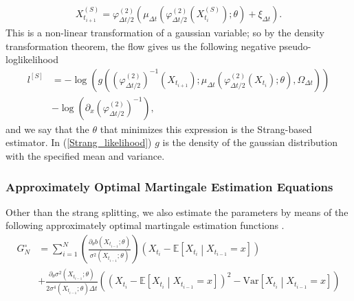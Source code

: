 \begin{align}
    X_{t_{i+1}}^{(S)} = \varphi_{\Delta t / 2}^{(2)}\left(\mu_{\Delta t}\left(\varphi_{\Delta t/2}^{(2)}\left(X_{t_{i}}^{(S)}\right); \theta\right) + \xi_{\Delta t}\right).
\end{align}
This is a non-linear transformation of a gaussian variable; so by the density transformation theorem, the flow gives us the following negative pseudo-loglikelihood 
\begin{align}
    l^{[S]} &= -\log\left(g\left(\left(\varphi_{\Delta t / 2}^{(2)}\right)^{-1}\left(X_{t_{i+1}}\right); \mu_{\Delta t}\left(\varphi_{\Delta t/2}^{(2)}\left(X_{t_{i}}\right); \theta \right), \Omega_{\Delta t} \right) \right) \nonumber \\
    &- \log\left(\partial_x \left(\varphi_{\Delta t / 2}^{(2)}\right)^{-1} \right), \label{Strang_likelihood}
\end{align}
and we say that the $\theta$ that minimizes this expression is the Strang-based estimator. In (\ref{Strang_likelihood}) $g$ is the density of the gaussian distribution with the specified mean and variance.
\subsubsection{Approximately Optimal Martingale Estimation Equations}
Other than the strang splitting, we also estimate the parameters by means of the following approximately optimal martingale estimation functions \cite[Example 1.11]{StatisticalMethodsForSDE}.
\begin{align}
    G_N^{\circ} &= \sum_{i = 1}^N 
    \left(
        \frac{\partial_\theta b\left(X_{t_{i-1}};\theta\right)}{\sigma^2\left(X_{t_{i-1}};\theta\right)}
    \right) \left(X_{t_{i}} - \mathbb{E}\left[X_{t_{i}} \middle| X_{t_{i-1}} = x\right]\right) \nonumber \\
    &+ \frac{\partial_\theta\sigma^2\left(X_{t_{i-1}}; \theta\right)}{2\sigma^4\left(X_{t_{i - 1}}; \theta\right)\Delta t}\left(\left(X_{t_{i}} - \mathbb{E}\left[X_{t_{i}} \middle| X_{t_{i-1}} = x\right]\right)^2 - \textrm{Var}\left[X_{t_{i}} \middle| X_{t_{i-1}} = x\right]\right) \label{eq:approximatelyOptimalMartingale}
\end{align}

